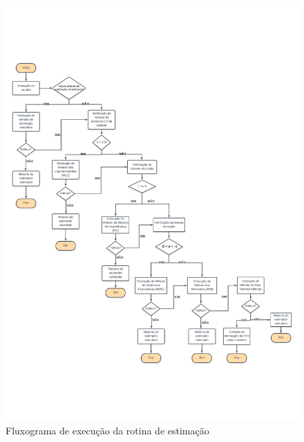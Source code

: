 \begin{figure}[H]
     \centering
     \includegraphics[scale=0.80]{plots/FluxogramaDeExecucao-A4.pdf}
     \caption{Fluxograma de execução da rotina de estimação}
     \label{fig1}
\end{figure}

